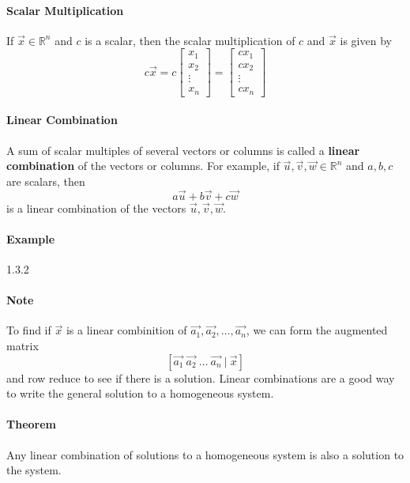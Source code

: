 \paragraph*{Scalar Multiplication} If $\vec{x} \in \mathbb{R}^n$ and $c$ is a scalar, then the scalar multiplication of $c$ and $\vec{x}$ is given by
\[c\vec{x} = c \begin{bmatrix}
    x_1 \\
    x_2 \\
    \vdots \\
    x_n
\end{bmatrix} = \begin{bmatrix}
    cx_1 \\
    cx_2 \\
    \vdots \\
    cx_n
\end{bmatrix}\]

\paragraph*{Linear Combination}
A sum of scalar multiples of several vectors or columns is called a \textbf{linear combination} of the vectors or columns.
For example, if $\vec{u}, \vec{v}, \vec{w} \in \mathbb{R}^n$ and $a, b, c$ are scalars, then
\[a\vec{u} + b\vec{v} + c\vec{w}\]
is a linear combination of the vectors $\vec{u}, \vec{v}, \vec{w}$.

\paragraph*{Example} 1.3.2 %

\paragraph*{Note} To find if $\vec{x}$ is a linear combinition of $\vec{a_1}, \vec{a_2}, \ldots, \vec{a_n}$, we can form the augmented matrix
\[[\vec{a_1} \ \vec{a_2} \ \ldots \ \vec{a_n} \ | \ \vec{x}]\]
and row reduce to see if there is a solution. Linear combinations are a good way to write the general solution to a homogeneous system.

\paragraph*{Theorem} Any linear combination of solutions to a homogeneous system is also a solution to the system.
